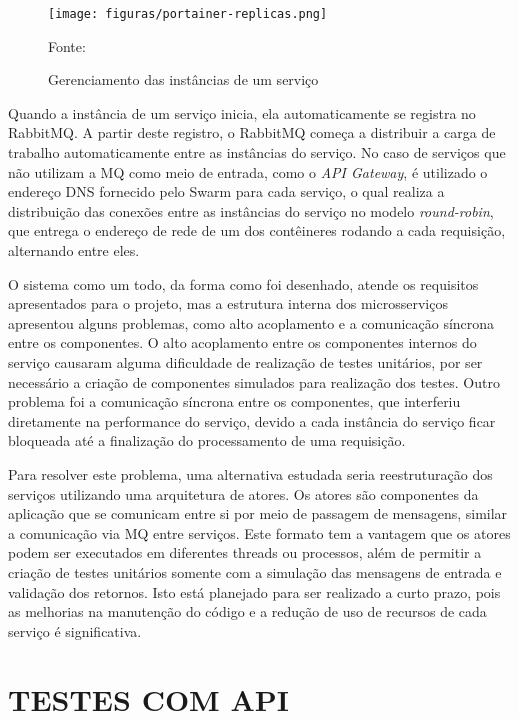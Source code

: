\begin{figure}[H]
	\centering
	\caption{Gerenciamento das instâncias de um serviço}
	\texttt{[image: figuras/portainer-replicas.png]}

	\label{fig:portainer-replicas}
	\footnotesize Fonte: \fonteOAutor
\end{figure}

Quando a instância de um serviço inicia, ela automaticamente se registra
no RabbitMQ. A partir deste registro, o RabbitMQ começa a distribuir a carga
de trabalho automaticamente entre as instâncias do serviço. No caso de
serviços que não utilizam a \ac{MQ} como meio de entrada, como o
\emph{API Gateway}, é utilizado o endereço \ac{DNS} fornecido pelo Swarm
para cada serviço, o qual realiza a distribuição das conexões entre as
instâncias do serviço no modelo \emph{round-robin}, que entrega o
endereço de rede de um dos contêineres rodando a cada requisição, alternando
entre eles.

O sistema como um todo, da forma como foi desenhado, atende os requisitos
apresentados para o projeto, mas a estrutura interna dos microsserviços
apresentou alguns problemas, como alto acoplamento e a comunicação síncrona
entre os componentes. O alto acoplamento entre os componentes internos do
serviço causaram alguma dificuldade de realização de testes unitários, por
ser necessário a criação de componentes simulados para realização dos testes.
Outro problema foi a comunicação síncrona entre os componentes, que
interferiu diretamente na performance do serviço, devido a cada instância do
serviço ficar bloqueada até a finalização do processamento de uma requisição.

Para resolver este problema, uma alternativa estudada seria reestruturação
dos serviços utilizando uma arquitetura de atores. Os atores são componentes
da aplicação que se comunicam entre si por meio de passagem de mensagens,
similar a comunicação via \ac{MQ} entre serviços. Este formato tem a vantagem
que os atores podem ser executados em diferentes threads ou processos,
além de permitir a criação de testes unitários somente com a simulação das
mensagens de entrada e validação dos retornos. Isto está planejado para ser
realizado a curto prazo, pois as melhorias na manutenção do código e a
redução de uso de recursos de cada serviço é significativa.

\section{TESTES COM API}

